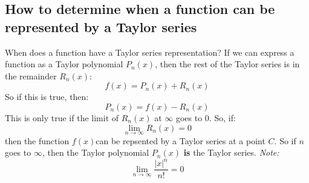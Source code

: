 \documentclass{report}
\begin{document}
    \subsection{How to determine when a function can be represented by a Taylor series}
        When does a function have a Taylor series representation?
        If we can express a function as a Taylor polynomial \(P_n(x)\), then the rest of the Taylor series is in the remainder \(R_n(x)\):
        \[f(x) = P_n(x) + R_n(x)\]
        So if this is true, then:
        \[P_n(x) = f(x) - R_n(x)\]
        This is only true if the limit of \(R_n(x)\) at \(\infty\) goes to \(0\).
        So, if:
        \[\lim_{n \to \infty} R_n(x) = 0\]
        then the function \(f(x)\)can be repsented by a Taylor series at a point \(C\).
        So if \(n\) goes to \(\infty\), then the Taylor polynomial \(P_n(x)\) \textbf{is} the Taylor series.
        \textit{Note:} \[\lim_{n \to \infty} \frac{|x|^n}{n!} = 0\]
\end{document}
